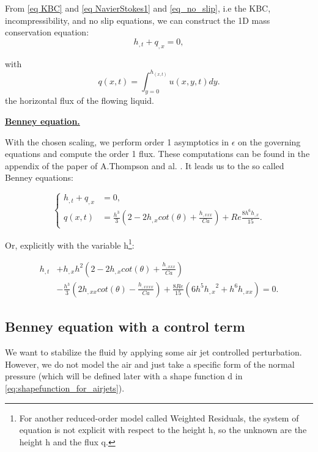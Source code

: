 \documentclass[12pt]{article}
\begin{document}
From \eqref{eq KBC} and \eqref{eq NavierStokes1} and  \eqref{eq_no_slip}, i.e the KBC, incompressibility, and no slip equations, we can construct the 1D mass conservation equation: 
\begin{equation}\label{eq mass conservation}
    h_{,t} + q_{,x} = 0,
\end{equation}

with 
\begin{equation}\label{eq:Benney_flux}
    q(x, t) = \int_{y=0}^{h_(x, t)} u(x, y, t)dy.
\end{equation}
the horizontal flux of the flowing liquid.

\vspace{0.5cm}
\underline{\textbf{Benney equation.}}

With the chosen scaling, we perform order 1 asymptotics in $\epsilon$ on the governing equations and compute the order 1 flux.
 These computations can be found in the appendix of the paper of A.Thompson and al. \cite{A_Thompson_FLF_blowing_suction}. 
 It leads us to the so called Benney equations: 

\begin{equation}
    \boxed{
    \left\{
\begin{aligned}
    h_{,t}+q_{,x} &= 0,\\
    q(x, t) &= \frac{h^3}{3}(2-2h_{,x}cot(\theta) + \frac{h_{,xxx}}{Ca})+Re\frac{8h^6h_{,x}}{15}.
\end{aligned}
    \right.
}
\end{equation}

Or, explicitly with the variable h\footnote{For another reduced-order model called Weighted Residuals, 
the system of equation is not explicit with respect to the height h, so the unknown are the height h and the flux q.}: 

\begin{equation}\label{Benney_eq}
\boxed{
\begin{aligned}
    h_{,t} &+ h_{,x}h^2 \left( 2-2h_{,x}cot(\theta) + \frac{h_{,xxx}}{Ca}\right) \\ &- \frac{h^3}{3}\left( 2h_{,xx}cot(\theta) - \frac{h_{,xxxx}}{Ca} \right) + \frac{8Re}{15} \left( 6h^5 {h_{,x}}^2 + h^6 h_{,xx} \right) = 0.
\end{aligned}    
}
\end{equation}




\subsection{Benney equation with a control term}
We want to stabilize the fluid by applying some air jet controlled perturbation. However, we do not model the air and just take a specific form of the normal pressure (which will be defined later with 
a shape function d in \eqref{eq:shapefunction_for_airjets}). 
\\
\end{document}
